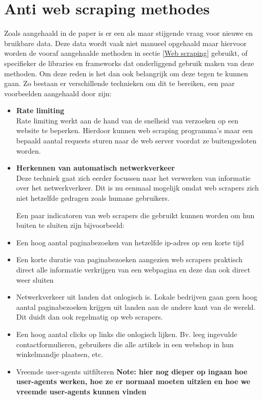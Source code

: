 \section{Anti web scraping methodes}
Zoals aangehaald in de paper \cite{10.1007/978-3-030-90016-8_4} is er een als maar stijgende vraag voor nieuwe en bruikbare data. Deze data wordt vaak niet manueel opgehaald maar hiervoor worden de vooraf aangehaalde methoden in sectie \ref{Web scraping} gebruikt, of specifieker de libraries en frameworks dat onderliggend gebruik maken van deze methoden. Om deze reden is het dan ook belangrijk om deze tegen te kunnen gaan. Zo bestaan er verschillende technieken om dit te bereiken, een paar voorbeelden aangehaald door \autocite{10.1007/978-3-030-90016-8_4} zijn:
\begin{itemize}
    \item \textbf{Rate limiting} 
    \\
Rate limiting werkt aan de hand van de snelheid van verzoeken op een website te beperken. Hierdoor kunnen web scraping programma's maar een bepaald aantal requests sturen naar de web server voordat ze buitengesloten worden.
    \item \textbf{Herkennen van automatisch netwerkverkeer} 
    \\
Deze techniek gaat zich eerder focussen naar het verwerken van informatie over het netwerkverkeer.
Dit is nu eenmaal mogelijk omdat web scrapers zich niet hetzelfde gedragen zoals humane gebruikers. 

Een paar indicatoren van web scrapers die gebruikt kunnen worden om hun buiten te sluiten zijn bijvoorbeeld:
\item Een hoog aantal paginabezoeken van hetzelfde ip-adres op een korte tijd
\item Een korte duratie van paginabezoeken aangezien web scrapers praktisch direct alle informatie verkrijgen van een webpagina en deze dan ook direct weer sluiten
\item  Netwerkverkeer uit landen dat onlogisch is. Lokale bedrijven gaan geen hoog aantal paginabezoeken krijgen uit landen aan de andere kant van de wereld. Dit duidt dan ook regelmatig op web scrapers. 
\item Een hoog aantal clicks op links die onlogisch lijken. Bv. leeg ingevulde contactformulieren, gebruikers die alle artikels in een webshop in hun winkelmandje plaatsen, etc.
\item Vreemde user-agents uitfilteren \textbf{Note: hier nog dieper op ingaan hoe user-agents werken, hoe ze er normaal moeten uitzien en hoe we vreemde user-agents kunnen vinden}
    

\end{itemize}

